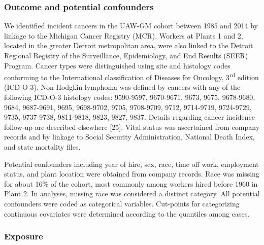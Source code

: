 \documentclass[
  11pt,
  letterpaper,
  DIV=11,
  numbers=noendperiod]{scrartcl}
\begin{document}
\subsubsection{Outcome and potential
confounders}\label{outcome-and-potential-confounders}

We identified incident cancers in the UAW-GM cohort between 1985 and
2014 by linkage to the Michigan Cancer Registry (MCR). Workers at Plants
1 and 2, located in the greater Detroit metropolitan area, were also
linked to the Detroit Regional Registry of the Surveillance,
Epidemiology, and End Results (SEER) Program. Cancer types were
distinguished using site and histology codes conforming to the
International classification of Diseases for Oncology,
3\textsuperscript{rd} edition (ICD-O-3). Non-Hodgkin lymphoma was
defined by cancers with any of the following ICD-O-3 histology codes:
9590-9597, 9670-9671, 9673, 9675, 9678-9680, 9684, 9687-9691, 9695,
9698-9702, 9705, 9708-9709, 9712, 9714-9719, 9724-9729, 9735, 9737-9738,
9811-9818, 9823, 9827, 9837. Details regarding cancer incidence
follow-up are described elsewhere {[}25{]}. Vital status was ascertained
from company records and by linkage to Social Security Administration,
National Death Index, and state mortality files.

Potential confounders including year of hire, sex, race, time off work,
employment status, and plant location were obtained from company
records. Race was missing for about 16\% of the cohort, most commonly
among workers hired before 1960 in Plant 2. In analyses, missing race
was considered a distinct category. All potential confounders were coded
as categorical variables. Cut-points for categorizing continuous
covariates were determined according to the quantiles among cases.

\subsubsection{Exposure}\label{exposure}
\end{document}
